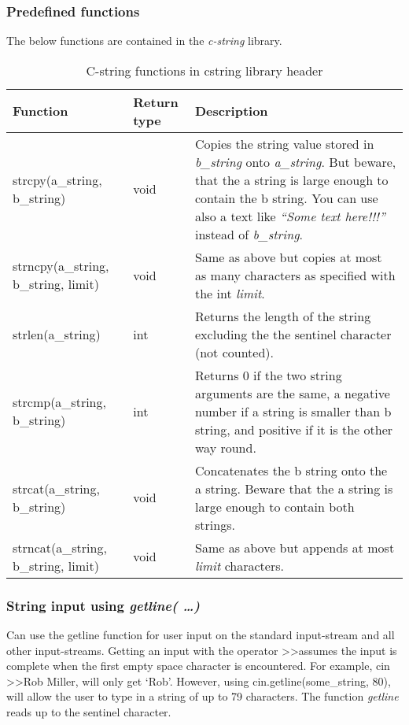 \subsubsection*{Predefined functions}
The below functions are contained in the \emph{c-string} library.

\begin{table}[h]
\begin{center}
\renewcommand{\arraystretch}{1.8}
\begin{tabular}{ m{7cm} m{1.5cm} m{6cm} } %
\textbf{Function} & \textbf{Return type} & \textbf{Description}\\
\hline

strcpy(a\_string, b\_string) & void & Copies the string value stored in \emph{b\_string} onto \emph{a\_string}.
But beware, that the a string is large enough to contain the b string. You can use also a text like 
\emph{``Some text here!!!''} instead of \emph{b\_string}.\\
\hline

strncpy(a\_string, b\_string, limit) & void & Same as above but copies at most as many characters as
specified with the int \emph{limit}.\\
\hline

strlen(a\_string) & int &Returns the length of the string excluding the the sentinel character (not counted).\\
\hline

strcmp(a\_string, b\_string) & int & Returns 0 if the two string arguments are the same, a negative number
if a string is smaller than b string, and positive if it is the other way round.\\
\hline

strcat(a\_string, b\_string) & void & Concatenates the b string onto the a string. Beware that the
a string is large enough to contain both strings.\\
\hline

strncat(a\_string, b\_string, limit) & void & Same as above but appends at most \emph{limit} characters.\\
\hline

\end{tabular}
\end{center}
\caption{C-string functions in cstring library header}
\label{table_1}
\end{table}

\subsubsection*{String input using \emph{getline( \ldots )}}
Can use the getline function for user input on the standard input-stream and all other input-streams.
Getting an input with the operator \textgreater\textgreater assumes the input is complete when the
first empty space character is encountered. For example, cin \textgreater\textgreater Rob Miller, will
only get `Rob'. However, using cin.getline(some\_string, 80), will allow the user to type in a string
of up to 79 characters. The function \emph{getline} reads up to the sentinel character.

